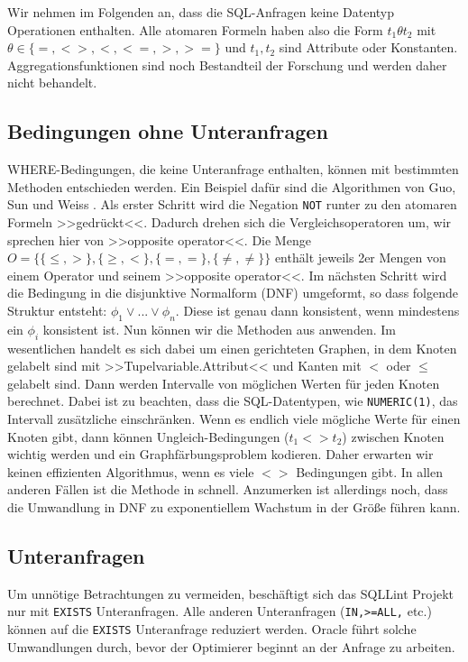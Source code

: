 Wir nehmen im Folgenden an, dass die SQL-Anfragen keine Datentyp Operationen enthalten. Alle atomaren Formeln haben also die Form $t_1\theta t_2$ mit $\theta\in \{=,<>,<,<=,>,>=\}$ und $t_1,t_2$ sind Attribute oder Konstanten. Aggregationsfunktionen sind noch Bestandteil der Forschung und werden daher nicht behandelt.

\subsection{Bedingungen ohne Unteranfragen}

WHERE-Bedingungen, die keine Unteranfrage enthalten, können mit bestimmten Methoden entschieden werden. Ein Beispiel dafür sind die Algorithmen von Guo, Sun und Weiss \cite{decideable1}. Als erster Schritt wird die Negation \verb|NOT| runter zu den atomaren Formeln >>gedrückt<<. Dadurch drehen sich die Vergleichsoperatoren um, wir sprechen hier von >>opposite operator<<. Die Menge $O=\{ \{\leq,>\} , \{\geq,<\} , \{ =, =\}, \{\neq,\neq\} \}$ enthält jeweils 2er Mengen von einem Operator und seinem >>opposite operator<<. Im nächsten Schritt wird die Bedingung in die disjunktive Normalform (DNF) umgeformt, so dass folgende Struktur entsteht: $\phi_1 \vee ... \vee \phi_n$. Diese ist genau dann konsistent, wenn mindestens ein $\phi_i$ konsistent ist. Nun können wir die Methoden aus \cite{decideable1} anwenden. Im wesentlichen handelt es sich dabei um einen gerichteten Graphen, in dem Knoten gelabelt sind mit >>Tupelvariable.Attribut<< und Kanten mit $<$ oder $\leq$ gelabelt sind. Dann werden Intervalle von möglichen Werten für jeden Knoten berechnet. Dabei ist zu beachten, dass die SQL-Datentypen, wie \verb|NUMERIC(1)|, das Intervall zusätzliche einschränken.
Wenn es endlich viele mögliche Werte für einen Knoten gibt, dann können Ungleich-Bedingungen ($t_1<>t_2$) zwischen Knoten wichtig werden und ein Graphfärbungsproblem kodieren. Daher erwarten wir keinen effizienten Algorithmus, wenn es viele $<>$ Bedingungen gibt. In allen anderen Fällen ist die Methode in \cite{decideable1} schnell. Anzumerken ist allerdings noch, dass die Umwandlung in DNF zu exponentiellem Wachstum in der Größe führen kann.

\subsection{Unteranfragen}

Um unnötige Betrachtungen zu vermeiden, beschäftigt sich das SQLLint Projekt nur mit \verb|EXISTS| Unteranfragen. Alle anderen Unteranfragen (\verb|IN,>=ALL,| etc.) können auf die \verb|EXISTS| Unteranfrage reduziert werden. Oracle führt solche Umwandlungen durch, bevor der Optimierer beginnt an der Anfrage zu arbeiten.

